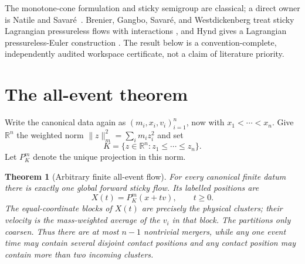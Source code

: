 \documentclass[10pt]{article}
\newtheorem{theorem}{Theorem}
\newcommand{\R}{\mathbb R}
\begin{document}
The monotone-cone formulation and sticky semigroup are classical; a direct
owner is Natile and Savar\'e~\cite{NS2009}.  Brenier, Gangbo, Savar\'e, and
Westdickenberg treat sticky Lagrangian pressureless flows with interactions
\cite{BGSW2013}, and Hynd gives a Lagrangian pressureless-Euler construction
\cite{Hynd2019}.  The result below is a convention-complete, independently
audited workspace certificate, not a claim of literature priority.

\section{The all-event theorem}
Write the canonical data again as $(m_i,x_i,v_i)_{i=1}^n$, now with
$x_1<\cdots<x_n$.  Give $\R^n$ the weighted norm
$\lVert z\rVert_m^2=\sum_i m_i z_i^2$ and set
\[
 K=\{z\in\R^n:z_1\leq\cdots\leq z_n\}.
\]
Let $P_K^m$ denote the unique projection in this norm.

\begin{theorem}[Arbitrary finite all-event flow]\label{thm:main}
For every canonical finite datum there is exactly one global forward sticky
flow.  Its labelled positions are
\begin{equation}\label{eq:projection}
 X(t)=P_K^m(x+t v),\qquad t\geq0.
\end{equation}
The equal-coordinate blocks of $X(t)$ are precisely the physical clusters;
their velocity is the mass-weighted average of the $v_i$ in that block.
The partitions only coarsen.  Thus there are at most $n-1$ nontrivial
mergers, while any one event time may contain several disjoint contact
positions and any contact position may contain more than two incoming
clusters.
\end{theorem}
\end{document}
